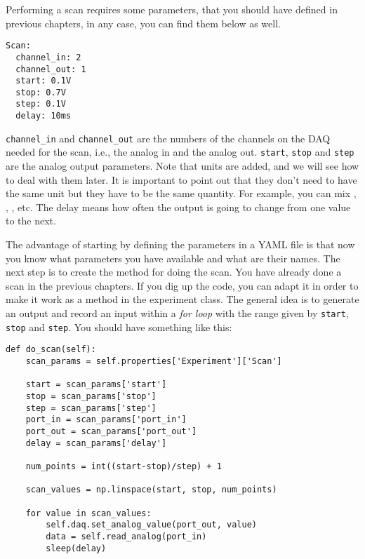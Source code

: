 {

Performing a scan requires some parameters, that you should have defined in previous chapters, in any case, you can find them below as well.

\begin{verbatim}
Scan:
  channel_in: 2
  channel_out: 1
  start: 0.1V
  stop: 0.7V
  step: 0.1V
  delay: 10ms
\end{verbatim}

\texttt{channel_in} and \texttt{channel_out} are the numbers of the channels on the DAQ needed for the scan, i.e., the analog in and the analog out. \texttt{start}, \texttt{stop} and \texttt{step} are the analog output parameters. Note that units are added, and we will see how to deal with them later. It is important to point out that they don't need to have the same unit but they have to be the same quantity. For example, you can mix ,  ,  , etc. The delay means how often the output is going to change from one value to the next.

The advantage of starting by defining the parameters in a {YAML} file is that now you know what parameters you have available and what are their names. The next step is to create the method for doing the scan. You have already done a scan in the previous chapters. If you dig up the code, you can adapt it in order to make it work as a method in the experiment class. The general idea is to
generate an output and record an input within a \emph{for loop} with the range given by \texttt{start}, \texttt{stop} and \texttt{step}. You
should have something like this:

\begin{verbatim}
def do_scan(self):
    scan_params = self.properties['Experiment']['Scan']
    
    start = scan_params['start']
    stop = scan_params['stop']
    step = scan_params['step']
    port_in = scan_params['port_in']
    port_out = scan_params['port_out']
    delay = scan_params['delay']

    num_points = int((start-stop)/step) + 1

    scan_values = np.linspace(start, stop, num_points)

    for value in scan_values:
        self.daq.set_analog_value(port_out, value)
        data = self.read_analog(port_in)
        sleep(delay)
\end{verbatim}

}
